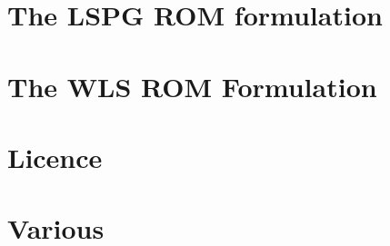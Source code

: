 \documentclass[twoside]{book}
\newcommand{\+}{\discretionary{\mbox{\scriptsize$\hookleftarrow$}}{}{}}
\newcommand{\clearemptydoublepage}{%
  \newpage{\pagestyle{empty}\cleardoublepage}%
}
\begin{document}
\chapter{The L\+S\+PG R\+OM formulation}
\label{autotoc_md29}

\chapter{The W\+LS R\+OM Formulation}
\label{autotoc_md30}

\chapter{Licence}
\label{autotoc_md31}

\chapter{Various}
\label{autotoc_md32}


\backmatter
\newpage
{}
\clearemptydoublepage
{}
\printindex
\end{document}
